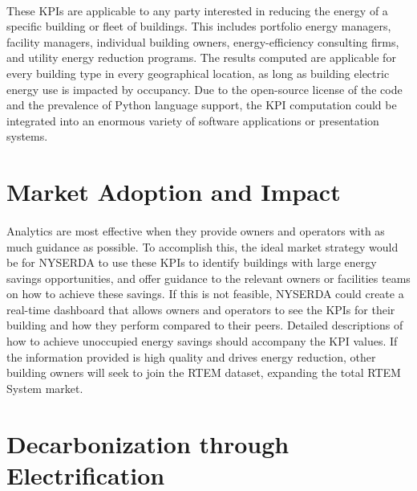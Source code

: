 \documentclass[a4paper]{article}
\begin{document}
\paragraph{}
These KPIs are applicable to any party interested in reducing the energy of a specific building or fleet of buildings. This includes portfolio energy managers, facility managers, individual building owners, energy-efficiency consulting firms, and utility energy reduction programs. The results computed are applicable for every building type in every geographical location, as long as building electric energy use is impacted by occupancy. Due to the open-source license of the code and the prevalence of Python language support, the KPI computation could be integrated into an enormous variety of software applications or presentation systems.

\section{Market Adoption and Impact}

\paragraph{}
Analytics are most effective when they provide owners and operators with as much guidance as possible. To accomplish this, the ideal market strategy would be for NYSERDA to use these KPIs to identify buildings with large energy savings opportunities, and offer guidance to the relevant owners or facilities teams on how to achieve these savings. If this is not feasible, NYSERDA could create a real-time dashboard that allows owners and operators to see the KPIs for their building and how they perform compared to their peers. Detailed descriptions of how to achieve unoccupied energy savings should accompany the KPI values. If the information provided is high quality and drives energy reduction, other building owners will seek to join the RTEM dataset, expanding the total RTEM System market.

\section{Decarbonization through Electrification}
\end{document}
